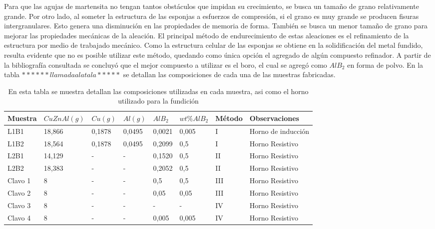 \documentclass[a4paper,12pt,fleqn,twoside,openany]{book}
\begin{document}
Para que las agujas de martensita no tengan tantos obstáculos que impidan su crecimiento, se busca un tamaño de grano relativamente grande. Por otro 
lado, al someter la estructura de las esponjas a esfuerzos de compresión, si el grano es muy grande se producen fisuras intergranulares. Esto genera 
una disminución en las propiedades de memoria de forma. También se busca un menor tamaño de grano para mejorar las propiedades mecánicas de la aleación.
El principal método de endurecimiento de estas aleaciones es el refinamiento de la estructura por medio de trabajado mecánico. Como la estructura 
celular de las esponjas se obtiene en la solidificación del metal fundido, resulta evidente que no es posible utilizar este método, quedando como 
única opción el agregado de algún compuesto refinador. A partir de la bibliografía consultada se concluyó que el 
mejor compuesto a utilizar es el boro, el cual se agregó como $AlB_2$ en forma de polvo. En la tabla $******llamada a la tala*****$ se detallan las composiciones de cada una de las muestras fabricadas. 

\begin{table} %
\begin{center}
\begin{tabular}{@{}llllllll@{}}  \toprule
Muestra & $CuZnAl (g)$ & $Cu (g)$ & $Al (g)$ & $AlB_2$ & $wt \% AlB_2$ & Método & Observaciones \\ \midrule
L1B1 & 18,866  & 0,1878 & 0,0495 & 0,0021 & 0,005 & I & Horno de inducción\\
L1B2 & 18,564  & 0,1878 & 0,0495 & 0,2099 & 0,5 & I &Horno Resistivo\\
L2B1 & 14,129  & - & -  & 0,1520 & 0,5 & II &Horno Resistivo \\
L2B2 & 18,383 & - & -  & 0,2052 & 0,5 &II & Horno Resistivo \\
Clavo 1 & 8 & - & - & 0,5 & 0,5 & III & Horno Resistivo \\
Clavo 2 & 8 & - & - & 0,05 & 0,05 &III & Horno Resistivo \\
Clavo 3 & 8 & - & - & - & - &  IV & Horno Resistivo \\
Clavo 4 & 8 & - & - & 0,005 & 0,005 &IV & Horno Resistivo \\
\bottomrule
\end{tabular}
\caption{En esta tabla se muestra detallan las composiciones utilizadas en cada muestra, asi como el horno utilizado para la fundición}

\end{center}
\end{table}
\end{document}
